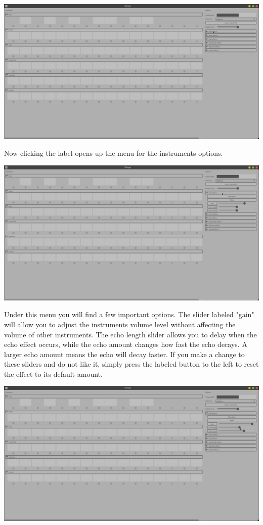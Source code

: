 \documentclass[11pt]{article}
\begin{document}
\begin{center}
\includegraphics[width=15cm]{./3.png}
\end{center}

Now clicking the label opens up the menu for the instruments options.

\begin{center}
\includegraphics[width=15cm]{./4.png}
\end{center}

Under this menu you will find a few important options. The slider labeled "gain"
will allow you to adjust the instruments volume level without affecting the
volume of other instruments. The echo length slider allows you to delay when 
the echo effect occurs, while the echo amount changes how fast the echo decays.
A larger echo amount means the echo will decay faster. If you make a change to
these sliders and do not like it, simply press the labeled button to the left
to reset the effect to its default amount.

\begin{center}
\includegraphics[width=15cm]{./5.png}
\end{center}
\end{document}

